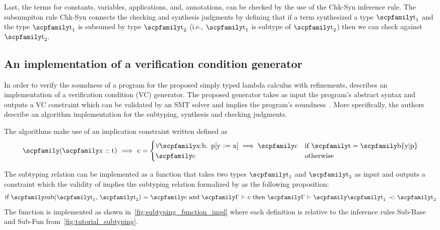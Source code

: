 \documentclass[
  oneside,
  english,
  coorientadorbanca,
  noabntexcite
]{ufsc-thesis-rn46-2019}
\newcommand{\code}[1]{\text{\scpfamily\setlength\spaceskip{0.35em}#1}}
\newcommand{\ctxtr}[2]{\code{{$\Gamma$}#1 {$\vdash$} #2}}
\newcommand{\subtyr}[2]{\code{#1 $\prec :$ #2}}
\newcommand{\subtycxr}[3]{\ctxtr{#1}{\subtyr{#2}{#3}}}
\newcommand{\implcons}[3]{\code{$($\code{#1} $::$ #2$)$ $\implies$ #3}}
\begin{document}
Last, the terms for constants, variables, applications, and, annotations, can be checked by the use of the Chk-Syn inference rule.
The subsumpiton rule Chk-Syn connects the checking and synthesis judgments by defining that if a term \code{e} synthesized a type $\code{t}_1$ and the type $\code{t}_1$ is subsumed by type $\code{t}_2$ (i.e., $\code{t}_1$ is subtype of $\code{t}_2$) then we can check \code{e} against $\code{t}_2$.

\subsection{An implementation of a verification condition generator}

In order to verify the soundness of a program for the proposed simply typed lambda calculus with refinements, \textcite{jhala2020tutorial} describes an implementation of a verification condition (VC) generator.
The proposed generator takes as input the program's abstract syntax and outputs a VC constraint \code{c} which can be validated by an SMT solver and implies the program's soundness~\cite{jhala2020tutorial}.
More specifically, the authors describe an algorithm implementation for the subtyping, synthesis and checking judgments.

The algorithms make use of an implication constraint written \implcons{x}{t}{c} defined as
\begin{equation*}
  \implcons{x}{t}{c} = \begin{cases}
    \forall\code{x:b. p[y := x]} \implies \code{c} & \textrm{if \code{t}} = \code{b\{y|p\}} \\
    \code{c}                                       & \textrm{otherwise}
  \end{cases}
\end{equation*}

The subtyping relation can be implemented as a function \code{sub} that takes two types $\code{t}_1$ and $\code{t}_2$ as input and outputs a constraint \code{c} which the validity of \code{c} implies the subtyping relation \subtyr{$\code{t}_1$}{$\code{t}_2$} formalized by \textcite{jhala2020tutorial} as the following proposition:
\begin{equation*}
  \textrm{if \code{sub($\code{t}_1$, $\code{t}_2$)} = \code{c} and \ctxtr{}{c} then \subtycxr{}{$\code{t}_1$}{$\code{t}_2$}}
\end{equation*}
The function \code{sub} is implemented as shown in~\cref{fig:subtyping_function_impl} where each definition is relative to the inference rules Sub-Base and Sub-Fun from~\cref{fig:tutorial_subtyping}.
\end{document}
